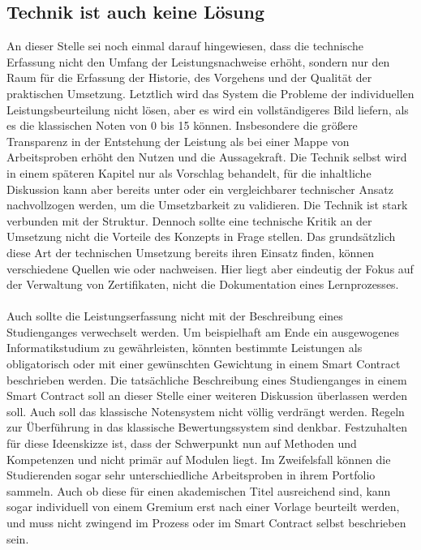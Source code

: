 \documentclass[conference]{IEEEtran}
\begin{document}
\subsection{Technik ist auch keine Lösung}
An dieser Stelle sei noch einmal darauf hingewiesen, dass die technische Erfassung nicht den Umfang der Leistungsnachweise erhöht, sondern nur den Raum für die Erfassung der Historie, des Vorgehens und der Qualität der praktischen Umsetzung.
Letztlich wird das System die Probleme der individuellen Leistungsbeurteilung nicht lösen, aber es wird ein vollständigeres Bild liefern, als es die klassischen Noten von 0 bis 15 können. Insbesondere die größere Transparenz in der Entstehung der Leistung als bei einer Mappe von Arbeitsproben erhöht den Nutzen und die Aussagekraft. 
Die Technik selbst wird in einem späteren Kapitel nur als Vorschlag behandelt, für die inhaltliche Diskussion kann aber bereits unter \cite{Idee} oder \cite{brazil} ein vergleichbarer technischer Ansatz nachvollzogen werden, um die Umsetzbarkeit zu validieren. Die Technik ist stark verbunden mit der Struktur. Dennoch sollte eine technische Kritik an der Umsetzung  nicht die Vorteile des Konzepts in Frage stellen. Das grundsätzlich diese Art der technischen Umsetzung bereits ihren Einsatz finden, können verschiedene Quellen wie \cite{blockcerts2024} oder \cite{blockchaincert2024} nachweisen. Hier liegt aber eindeutig der Fokus auf der Verwaltung von Zertifikaten, nicht die Dokumentation eines Lernprozesses.  
\\\\
Auch sollte die Leistungserfassung nicht mit der Beschreibung eines Studienganges verwechselt werden. Um beispielhaft am Ende ein ausgewogenes Informatikstudium zu gewährleisten, könnten bestimmte Leistungen als obligatorisch oder mit einer gewünschten Gewichtung in einem Smart Contract beschrieben werden. Die tatsächliche Beschreibung eines Studienganges in einem Smart Contract soll an dieser Stelle einer weiteren Diskussion überlassen werden soll. Auch soll das klassische Notensystem nicht völlig verdrängt werden. Regeln zur Überführung in das klassische Bewertungssystem sind denkbar. Festzuhalten für diese Ideenskizze ist, dass der Schwerpunkt nun auf Methoden und Kompetenzen und nicht primär auf Modulen liegt. Im Zweifelsfall können die Studierenden sogar sehr unterschiedliche Arbeitsproben in ihrem Portfolio sammeln. Auch ob diese für einen akademischen Titel ausreichend sind, kann sogar individuell von einem Gremium erst nach einer Vorlage beurteilt werden, und muss nicht zwingend im Prozess oder im Smart Contract selbst beschrieben sein. 
\end{document}
